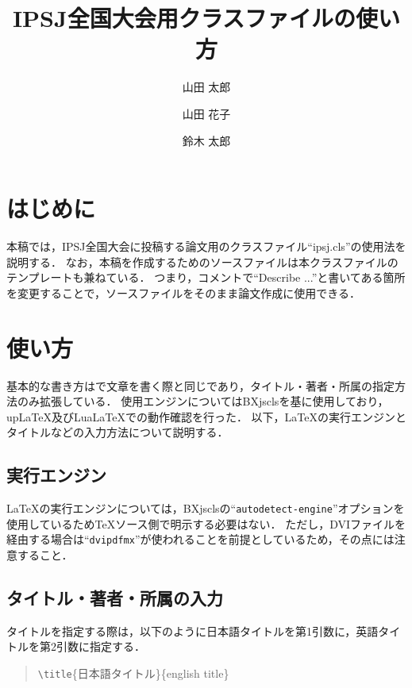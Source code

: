 \documentclass{ipsj}
\title
  {IPSJ全国大会用クラスファイルの使い方}
  {How to use the class file for the National Convention of IPSJ}
\author{山田 太郎}{Tarou Yamada}{IE}
\author{山田 花子}{Hanako Yamada}{I}
\author{鈴木 太郎}{Tarou Suzuki}{I,IS}
\affiliation{IE}
  {名古屋大学工学部電気電子・情報工学科}
  {Department of Information Engineering, School of Engineering, Nagoya University}
\affiliation{I}
  {名古屋大学大学院情報学研究科}
  {Graduate School of Informatics, Nagoya University}
\affiliation{IS}
  {名古屋大学大学院情報科学研究科}
  {Graduate School of Information Science, Nagoya University}
\theoremstyle{definition}
\begin{document}
\maketitle


\section{はじめに}

本稿では，IPSJ全国大会に投稿する論文用のクラスファイル``ipsj.cls''の使用法を説明する．
なお，本稿を作成するためのソースファイルは本クラスファイルのテンプレートも兼ねている．
つまり，コメントで``Describe ...''と書いてある箇所を変更することで，ソースファイルをそのまま論文作成に使用できる．





\section{使い方}

基本的な書き方は{\LaTeXe}で文章を書く際と同じであり，タイトル・著者・所属の指定方法のみ拡張している．
使用エンジンについてはBXjsclsを基に使用しており，upLaTeX及びLuaLaTeXでの動作確認を行った．
以下，{\LaTeX}の実行エンジンとタイトルなどの入力方法について説明する．



\subsection{実行エンジン}

{\LaTeX}の実行エンジンについては，BXjsclsの``\texttt{autodetect-engine}''オプションを使用しているため{\TeX}ソース側で明示する必要はない．
ただし，DVIファイルを経由する場合は``\texttt{dvipdfmx}''が使われることを前提としているため，その点には注意すること．



\subsection{タイトル・著者・所属の入力}

タイトルを指定する際は，以下のように日本語タイトルを第1引数に，英語タイトルを第2引数に指定する．
\begin{quote}
  \texttt{\textbackslash title}\{日本語タイトル\}\{english title\}
\end{quote}
\end{document}
